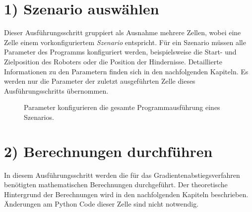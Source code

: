 \section*{1) Szenario auswählen}
\enlargethispage{1.5cm}
Dieser Ausführungsschritt gruppiert als Ausnahme mehrere Zellen, wobei eine Zelle einem vorkonfiguriertem \textit{Szenario} entspricht. Für ein Szenario müssen alle Parameter des Programms konfiguriert werden, beispielsweise die Start- und Zielposition des Roboters oder die Position der Hindernisse. Detaillierte Informationen zu den Parametern finden sich in den nachfolgenden Kapiteln. Es werden nur die Parameter der zuletzt ausgeführten Zelle dieses Ausführungsschritts übernommen. 
\begin{figure}[H]
	\centering
	\footnotesize
	\centerline{}
	\vspace*{-0.2cm}
	\caption{Parameter konfigurieren die gesamte Programmausführung eines Szenarios.}
\end{figure}

\section*{2) Berechnungen durchführen}
In diesem Ausführungsschritt werden die für das Gradientenabstiegsverfahren benötigten mathematischen Berechnungen durchgeführt. Der theoretische Hintergrund der Berechnungen wird in den nachfolgenden Kapiteln beschrieben. Änderungen am Python Code dieser Zelle sind nicht notwendig.

